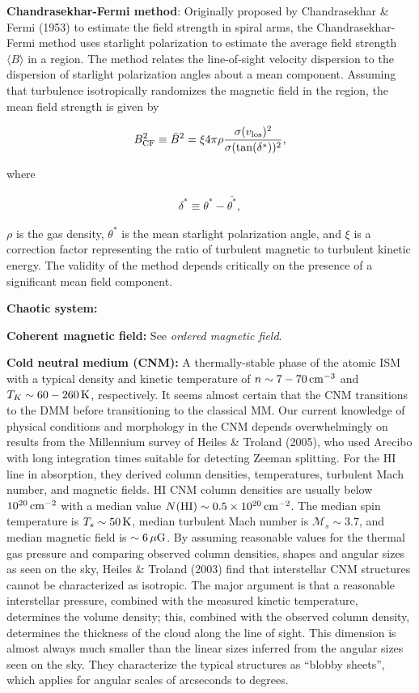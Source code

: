 \documentclass[a4paper,10pt]{article}
\begin{document}
{\noindent}\textbf{Chandrasekhar-Fermi method}: Originally proposed by Chandrasekhar \& Fermi (1953) to estimate the field strength in spiral arms, the Chandrasekhar-Fermi method uses starlight polarization to estimate the average field strength $\langle B\rangle$ in a region. The method relates the line-of-sight velocity dispersion to the dispersion of starlight polarization angles about a mean component. Assuming that turbulence isotropically randomizes the magnetic field in the region, the mean field strength is given by

\begin{align*}
    B_{\rm CF}^2 \equiv \bar{B}^2 = \xi4\pi\rho \frac{\sigma(v_{\rm los})^2}{\sigma(\tan(\delta^*))^2},
\end{align*}

{\noindent}where

\begin{align*}
    \delta^* \equiv \theta^* - \bar{\theta^*},
\end{align*}

{\noindent}$\rho$ is the gas density, $\theta^*$ is the mean starlight polarization angle, and $\xi$ is a correction factor representing the ratio of turbulent magnetic to turbulent kinetic energy. The validity of the method depends critically on the presence of a significant mean field component.

{\noindent}\textbf{Chaotic system:}

{\noindent}\textbf{Coherent magnetic field:} See \textit{ordered magnetic field}.

{\noindent}\textbf{Cold neutral medium (CNM):} A thermally-stable phase of the atomic ISM with a typical density and kinetic temperature of $n\sim7-70\,{\rm cm^{-3}}$ and $T_K\sim60-260\,{\rm K}$, respectively. It seems almost certain that the CNM transitions to the DMM before transitioning to the classical MM. Our current knowledge of physical conditions and morphology in the CNM depends overwhelmingly on results from the Millennium survey of Heiles \& Troland (2005), who used Arecibo with long integration times suitable for detecting Zeeman splitting. For the HI line in absorption, they derived column densities, temperatures, turbulent Mach number, and magnetic fields. HI CNM column densities are usually below $10^{20}\,{\rm cm^{-2}}$ with a median value $N({\rm HI})\sim0.5\times10^{20}\,{\rm cm^{-2}}$. The median spin temperature is $T_s\sim50\,{\rm K}$, median turbulent Mach number is $\mathcal{M}_s\sim3.7$, and median magnetic field is $\sim6\,\mu{\rm G}$. By assuming reasonable values for the thermal gas pressure and comparing observed column densities, shapes and angular sizes as seen on the sky, Heiles \& Troland (2003) find that interstellar CNM structures cannot be characterized as isotropic. The major argument is that a reasonable interstellar pressure, combined with the measured kinetic temperature, determines the volume density; this, combined with the observed column density, determines the thickness of the cloud along the line of sight. This dimension is almost always much smaller than the linear sizes inferred from the angular sizes seen on the sky. They characterize the typical structures as ``blobby sheets'', which applies for angular scales of arcseconds to degrees.
\end{document}
